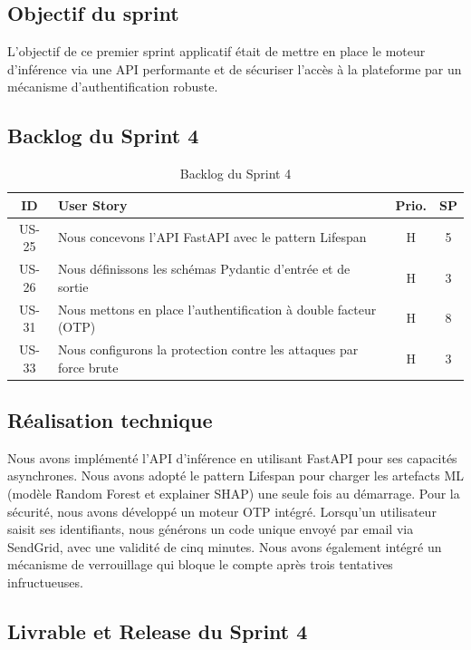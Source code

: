 \subsection{Objectif du sprint}

L'objectif de ce premier sprint applicatif était de mettre en place le moteur d'inférence via une API performante et de sécuriser l'accès à la plateforme par un mécanisme d'authentification robuste.

\subsection{Backlog du Sprint 4}

\begin{table}[htbp]
\centering
\caption{Backlog du Sprint 4}
\label{tab:sprint4}
\small
\begin{tabular}{|c|p{8.5cm}|c|c|}
\hline
\textbf{ID} & \textbf{User Story} & \textbf{Prio.} & \textbf{SP} \\
\hline
US-25 & Nous concevons l'API FastAPI avec le pattern Lifespan & H & 5 \\
\hline
US-26 & Nous définissons les schémas Pydantic d'entrée et de sortie & H & 3 \\
\hline
US-31 & Nous mettons en place l'authentification à double facteur (OTP) & H & 8 \\
\hline
US-33 & Nous configurons la protection contre les attaques par force brute & H & 3 \\
\hline
\end{tabular}
\end{table}

\subsection{Réalisation technique}

Nous avons implémenté l'API d'inférence en utilisant FastAPI pour ses capacités asynchrones. Nous avons adopté le pattern Lifespan pour charger les artefacts ML (modèle Random Forest et explainer SHAP) une seule fois au démarrage. Pour la sécurité, nous avons développé un moteur OTP intégré. Lorsqu'un utilisateur saisit ses identifiants, nous générons un code unique envoyé par email via SendGrid, avec une validité de cinq minutes. Nous avons également intégré un mécanisme de verrouillage qui bloque le compte après trois tentatives infructueuses.

\subsection{Livrable et Release du Sprint 4}


